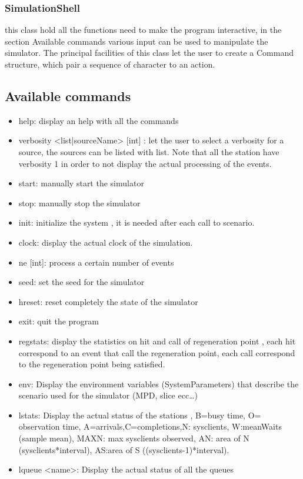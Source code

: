 \documentclass[12pt,a4paper]{article}
\begin{document}
\subsubsection{SimulationShell}
this class hold all the functions need to make the program interactive, in the section Available commands various input can be used to manipulate the simulator. The principal facilities of this class let the user to create a Command structure, which pair a sequence of character to an action.
\subsection{Available commands}
\begin{itemize}
    \item help: display an help with all the commands
    \item verbosity <list|sourceName> [int] : let the user to select a verbosity for a source, the sources can be listed with list. Note that all the station have verbosity 1 in order to not display the actual processing of the events.
    \item start: manually start the simulator
    \item stop: manually stop the simulator
    \item init: initialize the system , it is needed after each call to scenario.
    \item clock: display the actual clock of the simulation.
    \item ne [int]: process a certain number of events
    \item seed: set the seed for the simulator
    \item hreset: reset completely the state of the simulator
    \item exit: quit the program
    \item regstats: display the statistics on hit and call of regeneration point , each hit correspond to an event that call the regeneration point, each call correspond to the regeneration point being satisfied.
    \item env: Display the environment variables (SystemParameters) that describe the scenario used for the simulator (MPD, slice ecc\dots)
    \item lstats: Display the actual status of the stations , B=busy time, O= observation time, A=arrivals,C=completions,N: sysclients, W:meanWaits (sample mean), MAXN: max sysclients observed, AN: area of N (sysclients*interval), AS:area of S ((sysclients-1)*interval).
    \item lqueue <name>: Display the actual status of all the queues

\end{itemize}
\end{document}
